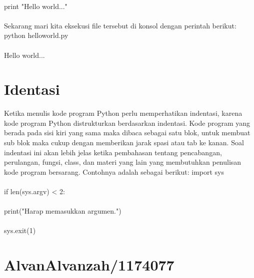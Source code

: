 \paragraph{}
print "Hello world..."
\paragraph{}
Sekarang mari kita eksekusi file tersebut di konsol dengan perintah berikut:
python helloworld.py
\paragraph{}
Hello world...

\section{Identasi}
Ketika menulis kode program Python perlu memperhatikan indentasi, karena kode program Python distrukturkan berdasarkan indentasi. Kode program yang berada pada sisi kiri yang sama maka dibaca sebagai satu blok, untuk membuat sub blok maka cukup dengan memberikan jarak spasi atau tab ke kanan.
Soal indentasi ini akan lebih jelas ketika pembahasan tentang pencabangan, perulangan, fungsi, class, dan materi yang lain yang membutuhkan penulisan kode program bersarang.
Contohnya adalah sebagai berikut:
import sys
\paragraph{}
if len(sys.argv) < 2:
\paragraph{}
    print("Harap memasukkan argumen.")
    \paragraph{}
    sys.exit(1)


\section{AlvanAlvanzah/1174077}
